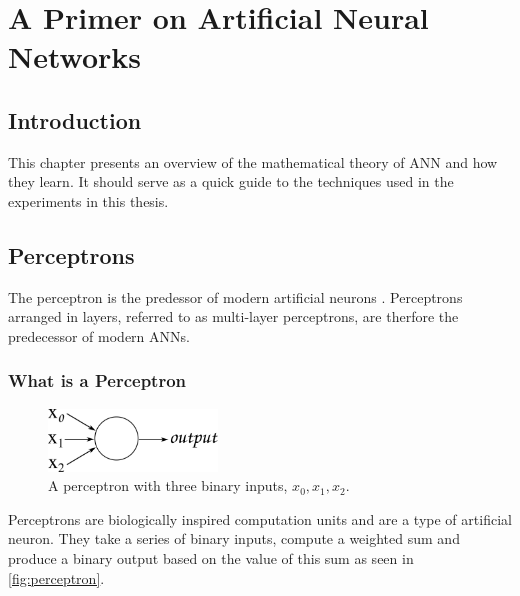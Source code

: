\chapter{A Primer on Artificial Neural Networks} %

\label{Chapter2} %


\section{Introduction}
This chapter presents an overview of the mathematical theory of \ac{ANN} and how they learn. It should serve as a quick guide to the techniques used in the experiments in this thesis.

\section{Perceptrons}
\label{sec:percep}
The perceptron is the predessor of modern artificial neurons \cite{rosenblatt1958perceptron}.
Perceptrons arranged in layers, referred to as multi-layer perceptrons, are therfore the predecessor of modern \acp{ANN}.

\subsection{What is a Perceptron}



\begin{figure}
	\centering
	\includegraphics[width=0.4\textwidth]{Figs/intro2dl/perceptron.png}
	
	\caption{A perceptron with three binary inputs, $x_0, x_1, x_2$.}
	\label{fig:perceptron}
\end{figure}

Perceptrons are biologically inspired computation units and are a type of artificial neuron. They take a series of binary inputs, compute a weighted sum and produce a binary output based on the value of this sum as seen in \autoref{fig:perceptron}.


